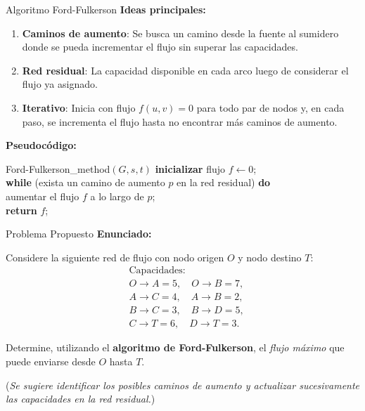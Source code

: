 \documentclass{beamer}
\begin{document}
\begin{frame}{Algoritmo Ford-Fulkerson}
\textbf{Ideas principales:}
\begin{enumerate}
    \item \textbf{Caminos de aumento}: Se busca un camino desde la fuente al sumidero donde se pueda incrementar el flujo sin superar las capacidades.
    \item \textbf{Red residual}: La capacidad disponible en cada arco luego de considerar el flujo ya asignado.
    \item \textbf{Iterativo}: Inicia con flujo $f(u,v)=0$ para todo par de nodos y, en cada paso, se incrementa el flujo hasta no encontrar más caminos de aumento.
\end{enumerate}

\medskip
\textbf{Pseudocódigo:}
\begin{block}{Ford-Fulkerson\_method$(G,s,t)$}
\textbf{inicializar} flujo $f \leftarrow 0$;\\
\textbf{while} (exista un camino de aumento $p$ en la red residual) \textbf{do}\\
\quad aumentar el flujo $f$ a lo largo de $p$;\\
\textbf{return} $f$;
\end{block}

\end{frame}

\begin{frame}{Problema Propuesto}
\textbf{Enunciado:}

Considere la siguiente red de flujo con nodo origen $O$ y nodo destino $T$:
\[
\begin{aligned}
&\text{Capacidades:}\\
& O \rightarrow A = 5,\quad O \rightarrow B = 7, \\
& A \rightarrow C = 4,\quad A \rightarrow B = 2, \\
& B \rightarrow C = 3,\quad B \rightarrow D = 5, \\
& C \rightarrow T = 6,\quad D \rightarrow T = 3.
\end{aligned}
\]

Determine, utilizando el \textbf{algoritmo de Ford-Fulkerson}, el \emph{flujo máximo} que puede enviarse desde $O$ hasta $T$. 

\medskip
(\textit{Se sugiere identificar los posibles caminos de aumento y actualizar sucesivamente las capacidades en la red residual.})
\end{frame}
\end{document}
